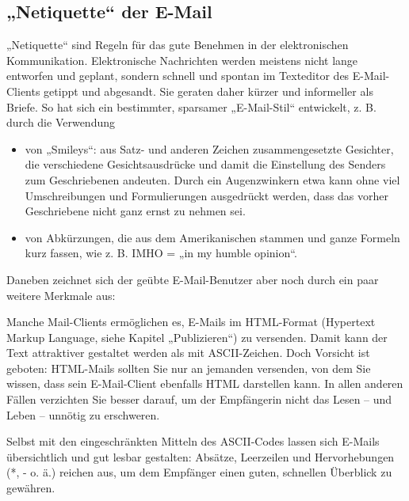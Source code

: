 \documentclass[]{book}
\providecommand{\tightlist}{%
  \setlength{\itemsep}{0pt}\setlength{\parskip}{0pt}}
\theoremstyle{definition}
\theoremstyle{definition}
\theoremstyle{definition}
\theoremstyle{remark}
\begin{document}
\subsection{„Netiquette`` der E-Mail}\label{netiquette-der-e-mail}

„Netiquette`` sind Regeln für das gute Benehmen in der elektronischen
Kommunikation. Elektronische Nachrichten werden meistens nicht lange
entworfen und geplant, sondern schnell und spontan im Texteditor des
E-Mail-Clients getippt und abgesandt. Sie geraten daher kürzer und
informeller als Briefe. So hat sich ein bestimmter, sparsamer
„E-Mail-Stil`` entwickelt, z. B. durch die Verwendung

\begin{itemize}
\tightlist
\item
  von „Smileys``: aus Satz- und anderen Zeichen zusammengesetzte
  Gesichter, die verschiedene Gesichtsausdrücke und damit die
  Einstellung des Senders zum Geschriebenen andeuten. Durch ein
  Augenzwinkern etwa kann ohne viel Umschreibungen und Formulierungen
  ausgedrückt werden, dass das vorher Geschriebene nicht ganz ernst zu
  nehmen sei.
\item
  von Abkürzungen, die aus dem Amerikanischen stammen und ganze Formeln
  kurz fassen, wie z. B. IMHO = „in my humble opinion``.
\end{itemize}

Daneben zeichnet sich der geübte E-Mail-Benutzer aber noch durch ein
paar weitere Merkmale aus:

Manche Mail-Clients ermöglichen es, E-Mails im HTML-Format (Hypertext
Markup Language, siehe Kapitel „Publizieren``) zu versenden. Damit kann
der Text attraktiver gestaltet werden als mit ASCII-Zeichen. Doch
Vorsicht ist geboten: HTML-Mails sollten Sie nur an jemanden versenden,
von dem Sie wissen, dass sein E-Mail-Client ebenfalls HTML darstellen
kann. In allen anderen Fällen verzichten Sie besser darauf, um der
Empfängerin nicht das Lesen -- und Leben -- unnötig zu erschweren.

Selbst mit den eingeschränkten Mitteln des ASCII-Codes lassen sich
E-Mails übersichtlich und gut lesbar gestalten: Absätze, Leerzeilen und
Hervorhebungen (*, - o. ä.) reichen aus, um dem Empfänger einen guten,
schnellen Überblick zu gewähren.
\end{document}
